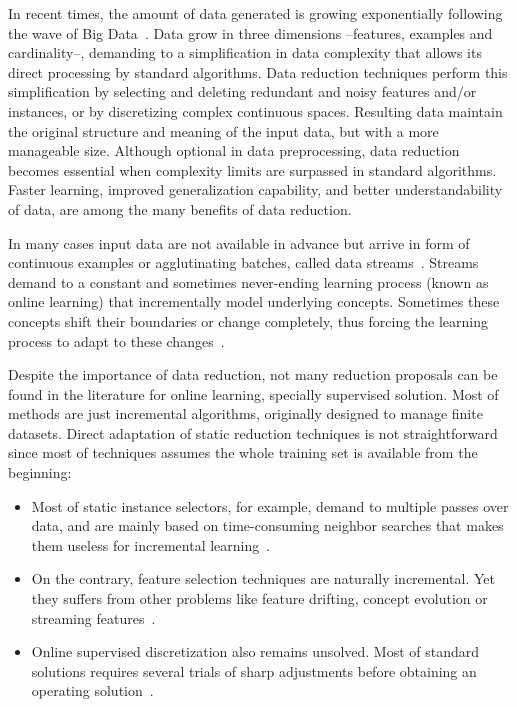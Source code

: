 \documentclass[preprint,12pt]{elsarticle}
\begin{document}
In recent times, the amount of data generated is growing exponentially following the wave of Big Data~\cite{mayer13, garcia16}. Data grow in three dimensions --features, examples and cardinality--, demanding to a simplification in data complexity that allows its direct processing by standard algorithms. Data reduction techniques perform this simplification by selecting and deleting redundant and noisy features and/or instances, or by discretizing complex continuous spaces. Resulting data maintain the original structure and meaning of the input data, but with a more manageable size. Although optional in data preprocessing, data reduction becomes essential when complexity limits are surpassed in standard algorithms. Faster learning, improved generalization capability, and better understandability of data, are among the many benefits of data reduction. 

In many cases input data are not available in advance but arrive in form of continuous examples or agglutinating batches, called data streams~\cite{gama10}. Streams demand to a constant and sometimes never-ending learning process (known as online learning) that incrementally model underlying concepts. Sometimes these concepts shift their boundaries or change completely, thus forcing the learning process to adapt to these changes~\cite{gama14}.

Despite the importance of data reduction, not many reduction proposals can be found in the literature for online learning, specially supervised solution. Most of methods are just incremental algorithms, originally designed to manage finite datasets. Direct adaptation of static reduction techniques is not straightforward since most of techniques assumes the whole training set is available from the beginning:
 
\begin{itemize}
	\item Most of static instance selectors, for example, demand to multiple passes over data, and are mainly based on time-consuming neighbor searches that makes them useless for incremental learning~\cite{garcia14}. 
	\item On the contrary, feature selection techniques are naturally incremental. Yet they suffers from other problems like feature drifting, concept evolution or streaming features~\cite{masud10}.
	\item Online supervised discretization also remains unsolved. Most of standard solutions requires several trials of sharp adjustments before obtaining an operating solution~\cite{webb14}.
\end{itemize}
\end{document}
